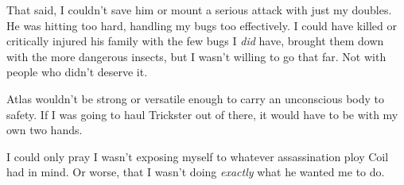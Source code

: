 That said, I couldn't save him or mount a serious attack with just my doubles.  He was hitting too hard, handling my bugs too effectively.  I could have killed or critically injured his family with the few bugs I \emph{did} have, brought them down with the more dangerous insects, but I wasn't willing to go that far.  Not with people who didn't deserve it.



Atlas wouldn't be strong or versatile enough to carry an unconscious body to safety.  If I was going to haul Trickster out of there, it would have to be with my own two hands.



I could only pray I wasn't exposing myself to whatever assassination ploy Coil had in mind.  Or worse, that I wasn't doing \emph{exactly} what he wanted me to do.





